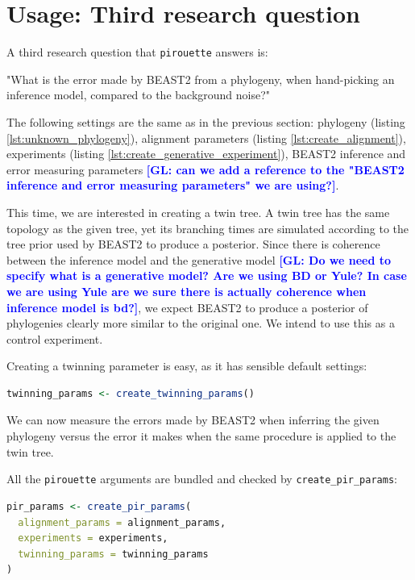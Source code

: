 \documentclass{article}
\newcommand{\giovanni}[1]{\textcolor{blue}{\textbf{[GL: #1]}}}
\begin{document}
\section{Usage: Third research question}

A third research question that \verb;pirouette; answers is:

"What is the error made by BEAST2 from a phylogeny, 
when hand-picking an inference model, compared to the background noise?"

The following settings are the same as in the previous section:
phylogeny (listing \ref{lst:unknown_phylogeny}), 
alignment parameters (listing \ref{lst:create_alignment}), 
experiments (listing \ref{lst:create_generative_experiment}),
BEAST2 inference and error measuring parameters \giovanni{can we add a reference to the "BEAST2 inference and error measuring parameters" we are using?}.

This time, we are interested in creating a twin tree. A twin tree
has the same topology as the given tree, 
yet its branching times are simulated according 
to the tree prior used by BEAST2 to produce a posterior. 
Since there is coherence between the inference model and the generative model \giovanni{Do we need to specify what is a generative model? Are we using BD or Yule? In case we are using Yule are we sure there is actually coherence when inference model is bd?}, we expect BEAST2 to produce a posterior of phylogenies clearly more similar to the original one. 
We intend to use this as a control experiment.

Creating a twinning parameter is easy, as it has sensible default settings:

\begin{lstlisting}[language=R, floatplacement=H, frame=single]
twinning_params <- create_twinning_params()
\end{lstlisting}

We can now measure the errors made by BEAST2 when inferring the given phylogeny versus the error it makes when the same procedure is applied to the twin tree.

All the \verb;pirouette; arguments are bundled and checked by \verb;create_pir_params;:

\begin{lstlisting}[language=R, floatplacement=H, frame=single]
pir_params <- create_pir_params(
  alignment_params = alignment_params,
  experiments = experiments,
  twinning_params = twinning_params
)
\end{lstlisting}
\end{document}
